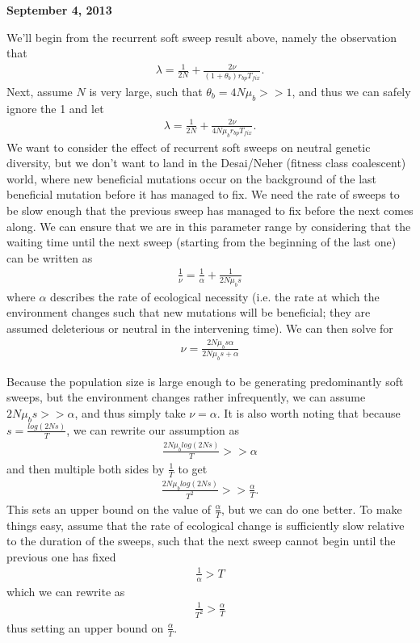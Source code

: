 \documentclass[reqno]{amsart}
\begin{document}
\begin{flushright}
	\textbf{September 4, 2013}
\end{flushright}
We'll begin from the recurrent soft sweep result above, namely the observation that
\begin{align}
	\lambda = \frac{1}{2N} + \frac{2\nu}{\left(1+\theta_b\right)r_{bp}T_{fix}}.
\end{align}
Next, assume $N$ is very large, such that $\theta_b = 4N\mu_b>>1$, and thus we can safely ignore the 1 and let
\begin{align}
	\lambda = \frac{1}{2N} + \frac{2\nu}{4N\mu_br_{bp}T_{fix}}.\label{coal.rate}
\end{align}
We want to consider the effect of recurrent soft sweeps on neutral genetic diversity, but we don't want to land in the Desai/Neher (fitness class coalescent) world\cite{Desai:2007fh,Desai:2013tk,Neher:2013wu,Neher:2013il}, where new beneficial mutations occur on the background of the last beneficial mutation before it has managed to fix. We need the rate of sweeps to be slow enough that the previous sweep has managed to fix before the next comes along. We can ensure that we are in this parameter range by considering that the waiting time until the next sweep (starting from the beginning of the last one) can be written as
\begin{align}
	\frac{1}{\nu} = \frac{1}{\alpha} + \frac{1}{2N\mu_b s}
\end{align}
where $\alpha$ describes the rate of ecological necessity (i.e. the rate at which the environment changes such that new mutations will be beneficial; they are assumed deleterious or neutral in the intervening time). We can then solve for 
\begin{align}
	\nu = \frac{2N\mu_b s \alpha}{2N\mu_bs + \alpha}
\end{align}

Because the population size is large enough to be generating predominantly soft sweeps, but the environment changes rather infrequently, we can assume $2N\mu_bs >> \alpha$, and thus simply take $\nu=\alpha$. It is also worth noting that because $s = \frac{log(2Ns)}{T}$, we can rewrite our assumption as 
\begin{align}
	\frac{2N\mu_b log(2Ns)}{T} >> \alpha
\end{align}
and then multiple both sides by $\frac{1}{T}$ to get
\begin{align}
	\frac{2N\mu_b log(2Ns)}{T^2} >> \frac{\alpha}{T}.
\end{align}
This sets an upper bound on the value of $\frac{\alpha}{T}$, but we can do one better. To make things easy, assume that the rate of ecological change is sufficiently slow relative to the duration of the sweeps, such that the next sweep cannot begin until the previous one has fixed
\begin{align}
	\frac{1}{\alpha} > T
\end{align}
which we can rewrite as
\begin{align}
	\frac{1}{T^2}>\frac{\alpha}{T}
\end{align}
thus setting an upper bound on $\frac{\alpha}{T}$.
\end{document}
